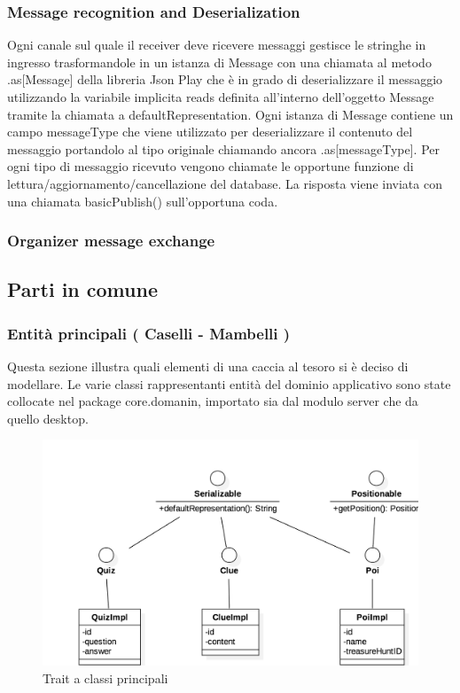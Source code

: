 \documentclass[12pt, italian]{article}
\begin{document}
\subsubsection*{Message recognition and Deserialization}
Ogni canale sul quale il receiver deve ricevere messaggi gestisce le stringhe in ingresso trasformandole in un istanza di Message con una chiamata al metodo .as[Message] della libreria Json Play che è in grado di deserializzare il messaggio utilizzando la variabile implicita reads definita all'interno dell'oggetto Message tramite la chiamata a defaultRepresentation. Ogni istanza di Message contiene un campo messageType che viene utilizzato per deserializzare il contenuto del messaggio portandolo al tipo originale chiamando ancora .as[messageType].
Per ogni tipo di messaggio ricevuto vengono chiamate le opportune funzione di lettura/aggiornamento/cancellazione del database.
La risposta viene inviata con una chiamata basicPublish() sull'opportuna coda.

\subsubsection{Organizer message exchange}
\subsection{Parti in comune}

\subsubsection{Entità principali ( Caselli - Mambelli )}
Questa sezione illustra quali elementi di una caccia al tesoro si è deciso di modellare.
Le varie classi rappresentanti entità del dominio applicativo sono state collocate nel package core.domanin, importato sia dal modulo server che da quello desktop.

\begin{figure}[H]
	\centering
	\includegraphics[width=1\textwidth]{img/diagram01.png}
	\caption{Trait a classi principali}
\end{figure}
\end{document}
